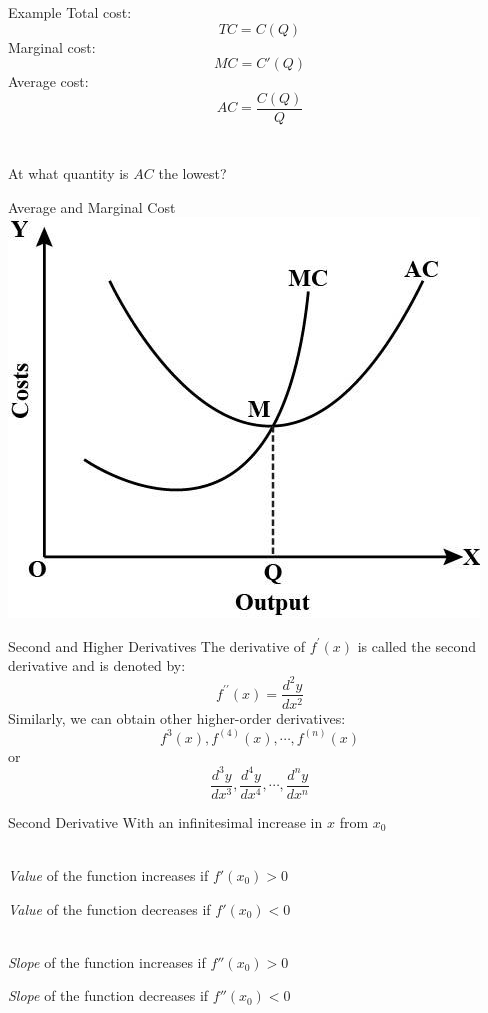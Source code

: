 \documentclass{./../../Latex/teaching_slides}
\begin{document}
\begin{frame}{Example}
Total cost: $$ TC = C(Q)$$
Marginal cost: $$ MC = C'(Q) $$
Average cost: $$ AC = \frac{C(Q)}{Q} $$ \\~\\
At what quantity is $AC$ the lowest? 
\end{frame}

\begin{frame}{Average and Marginal Cost}
\centering
\includegraphics[scale=0.7]{AC-MC.jpg}
\end{frame}

\begin{frame}{Second and Higher Derivatives}
The derivative of $f^{\prime}(x)$ is called the second derivative and is denoted by:
$$ f^{\prime \prime}(x) = \frac{d^{2} y }{ d x^{2}}$$
Similarly, we can obtain other higher-order derivatives:
$$
f^{3}(x), f^{(4)}(x), \cdots, f^{(n)}(x)
$$
or
$$
\frac{d^{3} y}{d x^{3}}, \frac{d^{4} y}{d x^{4}}, \cdots, \frac{d^{n} y}{d x^{n}}
$$
\end{frame}

\begin{frame}{Second Derivative}
With an infinitesimal increase in $x$ from $x_0$ \\~\\

\begin{witemize}
  \item \textit{Value} of the function increases if $f'(x_0)>0$
  \item \textit{Value} of the function decreases if $f'(x_0)<0$ \\~\\
  \item \textit{Slope} of the function increases if $f''(x_0)>0$
  \item \textit{Slope} of the function decreases if $f''(x_0)<0$
\end{witemize}
\end{frame}
\end{document}
